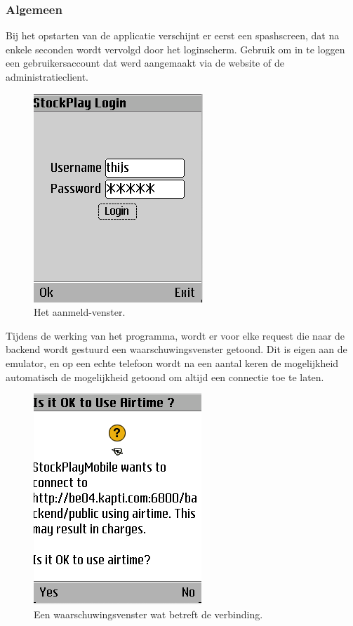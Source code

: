 \subsubsection{Algemeen}
Bij het opstarten van de applicatie verschijnt er eerst een spashscreen, dat na enkele seconden wordt vervolgd door het loginscherm. Gebruik om in te loggen een gebruikersaccount dat werd aangemaakt via de website of de administratieclient.
\begin{figure}[h!]
	\centering
		\includegraphics[scale=0.75]{images/handleiding/mobile/Login}
	\caption{Het aanmeld-venster.}
	\label{fig:handl:mobile:login}
\end{figure}

Tijdens de werking van het programma, wordt er voor elke request die naar de backend wordt gestuurd een waarschuwingsvenster getoond. Dit is eigen aan de emulator, en op een echte telefoon wordt na een aantal keren de mogelijkheid automatisch de mogelijkheid getoond om altijd een connectie toe te laten.
\begin{figure}[h!]
	\centering
		\includegraphics[scale=0.75]{images/handleiding/mobile/ConnectionWarning}
	\caption{Een waarschuwingsvenster wat betreft de verbinding.}
	\label{fig:handl:mobile:warning}
\end{figure}

